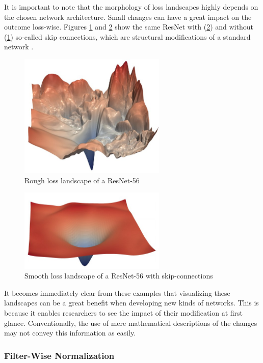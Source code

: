 \documentclass{acmsiggraph}               %
\begin{document}
It is important to note that the morphology of loss landscapes highly depends on the chosen network architecture. Small changes can have a great impact on the outcome loss-wise. Figures \ref{fig:rough_loss} and \ref{fig:smooth_loss} show the same ResNet with (\ref{fig:smooth_loss}) and without (\ref{fig:rough_loss}) so-called skip connections, which are structural modifications of a standard network \cite{He2015}.

\begin{figure}
\centering
\includegraphics[width=2.75in]{rough_loss}
\caption{Rough loss landscape of a ResNet-56 \protect\cite{Li2017}}
\label{fig:rough_loss}
\end{figure}

\begin{figure}
  \centering
  \includegraphics[width=2.75in]{smooth_loss}
  \caption{Smooth loss landscape of a ResNet-56 with skip-connections \protect\cite{Li2017,He2015}}
  \label{fig:smooth_loss}
\end{figure}

It becomes immediately clear from these examples that visualizing these landscapes can be a great benefit when developing new kinds of networks. This is because it enables researchers to see the impact of their modification at first glance. Conventionally, the use of mere mathematical descriptions of the changes may not convey this information as easily.

\subsubsection{Filter-Wise Normalization}
\end{document}

